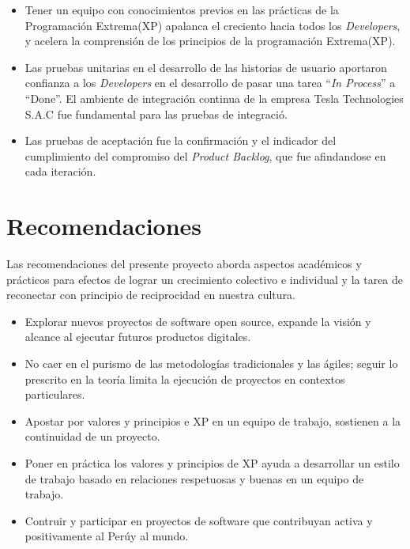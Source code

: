 \begin{spacing}{1.5}
\begin{itemize}
	\item Tener un equipo con conocimientos previos en las pr\'{a}cticas de la Programaci\'{o}n Extrema(XP) apalanca el creciento hacia todos los \textit{Developers}, y acelera la comprensi\'{o}n de los principios de la programaci\'{o}n Extrema(XP).
	
	\item Las pruebas unitarias en el desarrollo de las historias de usuario aportaron confianza a los \textit{Developers} en el desarrollo de pasar una tarea ``\textit{In Process}'' a ``Done''. El ambiente de integraci\'{o}n continua de la empresa Tesla Technologies S.A.C fue fundamental para las pruebas de integraci\'{o}.
	
	\item Las pruebas de aceptaci\'{o}n fue la confirmaci\'{o}n y el indicador del cumplimiento del compromiso del \textit{Product Backlog}, que fue afindandose en cada iteraci\'{o}n.
	
\end{itemize}
\clearpage
\section{Recomendaciones}
	Las recomendaciones del presente proyecto aborda aspectos acad\'{e}micos y pr\'{a}cticos para efectos de lograr un crecimiento colectivo e individual y la tarea de reconectar con principio de reciprocidad en nuestra cultura.
	
	\begin{itemize}
		\item Explorar nuevos proyectos de software open source, expande la visión y alcance al ejecutar futuros productos digitales.
		\item No caer en el purismo de las metodolog\'{i}as tradicionales y las \'{a}giles; seguir lo prescrito en la teor\'{i}a limita la ejecuci\'{o}n de proyectos en contextos particulares.
		\item Apostar por valores y principios e XP en un equipo de trabajo, sostienen a la continuidad de un proyecto.
		\item Poner en pr\'{a}ctica los valores y principios de XP ayuda a desarrollar un estilo de trabajo basado en relaciones respetuosas y buenas en un equipo de trabajo. 
		\item Contruir y participar en proyectos de software que contribuyan activa y positivamente al Per\'{u}y al mundo.
	\end{itemize}
\end{spacing}
